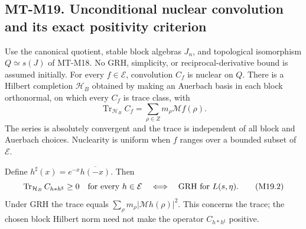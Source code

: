 \subsection*{MT-M19. Unconditional nuclear convolution and its exact positivity criterion}
Use the canonical quotient, stable block algebras \(J_n\), and
topological isomorphism \(Q\simeq s(J)\) of MT-M18. No GRH,
simplicity, or reciprocal-derivative bound is assumed initially.
For every \(f\in\mathcal E\), convolution \(C_f\) is nuclear on
\(Q\). There is a Hilbert completion \(\mathcal H_B\) obtained
by making an Auerbach basis in each block orthonormal, on which
every \(C_f\) is trace class, with
\[
 \operatorname{Tr}_{\mathcal H_B} C_f
       =\sum_{\rho\in Z}m_\rho\mathcal Mf(\rho).       \tag{M19.1}
\]
The series is absolutely convergent and the trace is independent
of all block and Auerbach choices. Nuclearity is uniform when
\(f\) ranges over a bounded subset of \(\mathcal E\).

Define \(h^\sharp(x)=e^{-x}\overline{h(-x)}\). Then
\[
 \operatorname{Tr}_{\mathcal H_B} C_{h*h^\sharp}\ge0
          \quad\hbox{for every }h\in\mathcal E
 \quad\Longleftrightarrow\quad
 \text{GRH for }L(s,\eta).                              \tag{M19.2}
\]
Under GRH the trace equals
\(\sum_\rho m_\rho|\mathcal Mh(\rho)|^2\).
This concerns the trace; the chosen block Hilbert norm need
not make the operator \(C_{h*h^\sharp}\) positive.


